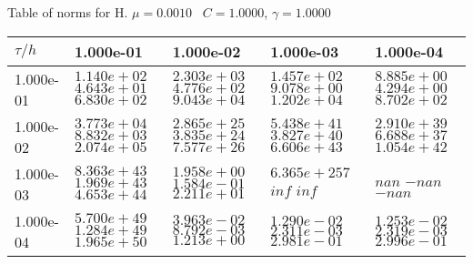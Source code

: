 \begin{center}
Table of norms for H. $\mu = 0.0010$ \, $C = 1.0000$, $\gamma = 1.0000$
  
\begin{tabular}{|p{1in}|p{1in}|p{1in}|p{1in}|p{1in}|} \hline
$\tau / h$ &1.000e-01 &1.000e-02 &1.000e-03 &1.000e-04 \\ \hline 
1.000e-01 & $1.140e+02$  $4.643e+01$  $6.830e+02$  & $2.303e+03$  $4.776e+02$  $9.043e+04$  & $1.457e+02$  $9.078e+00$  $1.202e+04$  & $8.885e+00$  $4.294e+00$  $8.702e+02$  \\ \hline 
1.000e-02 & $3.773e+04$  $8.832e+03$  $2.074e+05$  & $2.865e+25$  $3.835e+24$  $7.577e+26$  & $5.438e+41$  $3.827e+40$  $6.606e+43$  & $2.910e+39$  $6.688e+37$  $1.054e+42$  \\ \hline 
1.000e-03 & $8.363e+43$  $1.969e+43$  $4.653e+44$  & $1.958e+00$  $1.584e-01$  $2.211e+01$  & $6.365e+257$  $inf$  $inf$  & $nan$  $-nan$  $-nan$  \\ \hline 
1.000e-04 & $5.700e+49$  $1.284e+49$  $1.965e+50$  & $3.963e-02$  $8.792e-03$  $1.213e+00$  & $1.290e-02$  $2.311e-03$  $2.981e-01$  & $1.253e-02$  $2.319e-03$  $2.996e-01$  \\ \hline 

\end{tabular}\\[20pt]
\end{center}
